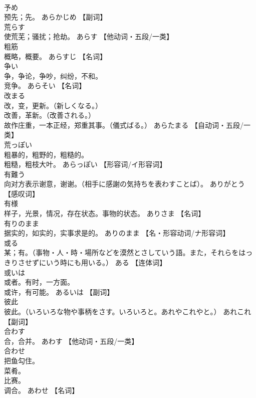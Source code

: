 \documentclass[8pt]{extreport}
\begin{document}
\begin{CJK}{UTF8}{min}
\\	予め	
\\	预先；先。	あらかじめ		【副词】
\\	荒らす	
\\	使荒芜；骚扰；抢劫。	あらす		【他动词・五段/一类】
\\	粗筋	
\\	概略，概要。	あらすじ		【名词】
\\	争い	
\\	争，争论，争吵，纠纷，不和。 
\\	竞争。	あらそい		【名词】
\\	改まる	
\\	改，变，更新。（新しくなる。） 
\\	改善，革新。（改善される。） 
\\	故作庄重，一本正经，郑重其事。（儀式ばる。）	あらたまる		【自动词・五段/一类】
\\	荒っぽい	
\\	粗暴的，粗野的，粗糙的。 
\\	粗糙，粗枝大叶。	あらっぽい		【形容词/イ形容词】
\\	有難う	
\\	向对方表示谢意，谢谢。（相手に感謝の気持ちを表わすことば）。	ありがとう		【感叹词】
\\	有様	
\\	样子，光景，情况，存在状态。事物的状态。	ありさま		【名词】
\\	有りのまま	
\\	据实的，如实的，实事求是的。	ありのまま		【名・形容动词/ナ形容词】
\\	或る	
\\	某；有。（事物・人・時・場所などを漠然とさしていう語。また，それらをはっきりさせずにいう時にも用いる。）	ある		【连体词】
\\	或いは	
\\	或者。有时，一方面。 
\\	或许，有可能。	あるいは		【副词】
\\	彼此	
\\	彼此。（いろいろな物や事柄をさす。いろいろと。あれやこれやと。）	あれこれ		【副词】
\\	合わす	
\\	合，合并。	あわす		【他动词・五段/一类】
\\	合わせ	
\\	把鱼勾住。 
\\	菜肴。 
\\	比赛。 
\\	调合。	あわせ		【名词】

\end{CJK}
\end{document}

